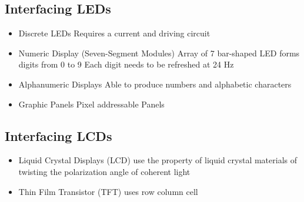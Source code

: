 \subsection{Interfacing LEDs }
\begin{itemize}
	\item Discrete \acs{LED}s
	\subitem Requires a current and driving circuit
	\item Numeric Display (Seven-Segment Modules)
	\subitem Array of 7 bar-shaped \acs{LED} forms digits from 0 to 9
	\subitem Each digit needs to be refreshed at 24 Hz
	\item Alphanumeric Displays
	\subitem Able to produce numbers and alphabetic characters
	\item Graphic Panels
	\subitem Pixel addressable Panels
\end{itemize}
\subsection{Interfacing \acs{LCD}s }
\begin{itemize}
	\item Liquid Crystal Displays (\acs{LCD}) use the property of liquid crystal materials of twisting the polarization angle of coherent light
	\item Thin Film Transistor (\acs{TFT}) uses row column cell
\end{itemize}
\clearpage